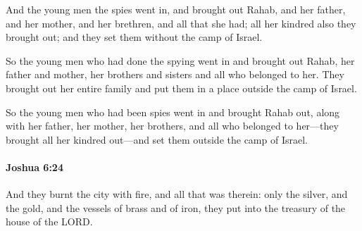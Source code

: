 			\begin{versebox}
					\item[BHS] 
					\item[ASV] And the young men the spies went in, and brought out Rahab, and her father, and her mother, and her brethren, and all that she had; all her kindred also they brought out; and they set them without the camp of Israel.
					\item[NIV] So the young men who had done the spying went in and brought out Rahab, her father and mother, her brothers and sisters and all who belonged to her. They brought out her entire family and put them in a place outside the camp of Israel.
					\item[NRSV] So the young men who had been spies went in and brought Rahab out, along with her father, her mother, her brothers, and all who belonged to her—they brought all her kindred out—and set them outside the camp of Israel.
			\end{versebox}

		\paragraph{Joshua 6:24} %
			\label{JOSHUA-6-24}

			And they burnt the city with fire, and all that was therein: only the silver, and the gold, and the vessels of brass and of iron, they put into the treasury of the house of the LORD.


